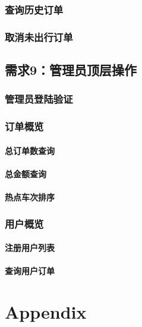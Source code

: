 \documentclass[UTF-8,twoside,c5size]{ctexart}
\def\hfparagraph#1{\paragraph{#1} \hfill}
\begin{document}
	\subsubsection{查询历史订单}
	
	\subsubsection{取消未出行订单}
	
	\subsection{需求9：管理员顶层操作}
	
	\subsubsection{管理员登陆验证}
	
	\subsubsection{订单概览}
	
	\hfparagraph{总订单数查询}
	
	\hfparagraph{总金额查询}
	
	\hfparagraph{热点车次排序}
	
	\subsubsection{用户概览}
	
	\hfparagraph{注册用户列表}
	
	\hfparagraph{查询用户订单}
		
	\section{Appendix}

	
\end{document}
